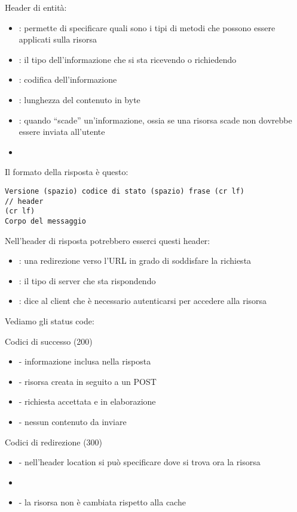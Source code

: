 Header di entit\`a:
\begin{itemize}
    \item {}: permette di specificare quali sono i tipi di metodi che possono essere applicati sulla risorsa
    \item {}: il tipo dell'informazione che si sta ricevendo o richiedendo
    \item {}: codifica dell'informazione
    \item {}: lunghezza del contenuto in  byte
    \item {}: quando ``scade'' un'informazione, ossia se una risorsa scade non dovrebbe essere inviata all'utente
    \item {}
\end{itemize}

Il formato della risposta \`e questo:

\begin{verbatim}
Versione (spazio) codice di stato (spazio) frase (cr lf)
// header
(cr lf)
Corpo del messaggio
\end{verbatim}

Nell'header di risposta potrebbero esserci questi header:
\begin{itemize}
    \item {}: una redirezione verso l'URL in grado di soddisfare la richiesta
    \item {}: il tipo di server che sta rispondendo
    \item {}: dice al client che \`e necessario autenticarsi per accedere alla risorsa
\end{itemize}

Vediamo gli status code:

Codici di successo (200)
\begin{itemize}
    \item {} - informazione inclusa nella risposta
    \item {} - risorsa creata in seguito a un POST
    \item {} - richiesta accettata e in elaborazione
    \item {} - nessun contenuto da inviare
\end{itemize}

Codici di redirezione (300)
\begin{itemize}
    \item {} - nell'header location si pu\`o specificare dove si trova ora la risorsa
    \item {}
    \item {} - la risorsa non \`e cambiata rispetto alla cache
\end{itemize}

